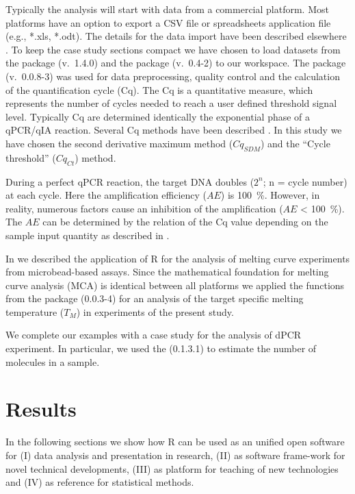 Typically the analysis will start with data from a commercial platform. 
Most platforms have an option to export a CSV file or spreadsheets application 
file (e.g., *.xls, *.odt). The details for the data import have been described 
elsewhere \citep{RDCT2010c, rodiger_rkward_2012}. To keep the case study 
sections compact we have chosen to load datasets from the  package 
\citep{ritz_2008, spiess_2008} (v.~1.4.0) and the  package (v.~0.4-2) to our 
workspace. The  package (v.~0.0.8-3) was used 
for data preprocessing, quality control and  the calculation of the 
quantification cycle (Cq). The Cq is a quantitative measure, which represents 
the number of cycles needed to reach a user defined threshold signal level. 
Typically Cq are determined identically the exponential phase of a qPCR/qIA 
reaction. Several Cq methods have been described \citep{ruijter_2013}. In this 
study we have chosen the second derivative maximum method ($Cq_{SDM}$) and the 
``Cycle threshold'' ($Cq_{Ct}$) method.

During a perfect qPCR reaction, the target DNA doubles ($2^{n}$; n = cycle 
number) at each cycle. Here the amplification efficiency ($AE$) is 100~\%. 
However, in reality, numerous factors cause an inhibition of the amplification 
($AE$ < 100~\%). The $AE$ can be determined by the relation of the Cq value 
depending on the sample input quantity as described in 
\citet{roediger_chippcr_2014}.

In \citet{roediger_RJ_2013} we described the application of R for the analysis 
of melting curve experiments from microbead-based assays. Since the mathematical 
foundation for melting curve analysis (MCA) is identical between all platforms 
we applied the functions from the  package (0.0.3-4) for an 
analysis of the target specific melting temperature ($T_{M}$) in experiments of 
the present study.

We complete our examples with a case study for the analysis of dPCR 
experiment. In particular, we used the  (0.1.3.1) to estimate the 
number of molecules in a sample.

\section{Results}

In the following sections we show how R can be used as an unified open 
software for (I) data analysis and presentation in research, 
(II) as software frame-work for novel technical developments, (III) as platform 
for teaching of new technologies and (IV) as reference for statistical methods.

